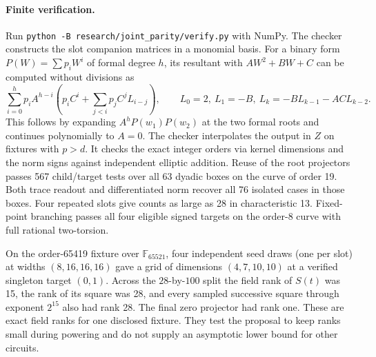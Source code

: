 \documentclass[11pt]{article}
\newcommand{\F}{\mathbb F}
\begin{document}
\paragraph{Finite verification.}
Run \texttt{python -B research/joint\_parity/verify.py} with NumPy.
The checker constructs the slot companion matrices in a monomial
basis. For a binary form $P(W)=\sum p_iW^i$ of formal degree $h$,
its resultant with $AW^2+BW+C$ can be computed without divisions as
\[
 \sum_{i=0}^{h}p_i A^{h-i}
   \left(p_i C^i+\sum_{j<i}p_j C^j L_{i-j}\right),\qquad
 L_0=2,\ L_1=-B,\ L_k=-B L_{k-1}-AC L_{k-2}.
\]
This follows by expanding $A^hP(w_1)P(w_2)$ at the two formal roots
and continues polynomially to $A=0$. The checker interpolates the
output in $Z$ on fixtures with $p>d$. It checks the exact integer
orders via kernel dimensions and the norm signs against independent
elliptic addition. Reuse of the root projectors passes
567 child/target tests over all 63 dyadic boxes on the curve of order
19. Both trace readout and differentiated norm recover all 76
isolated cases in those boxes. Four repeated slots give counts as
large as 28 in characteristic 13. Fixed-point branching passes all
four eligible signed targets on the order-8 curve with full rational
two-torsion.

On the order-65419 fixture over $\F_{65521}$, four independent
seed draws (one per slot) at widths $(8,16,16,16)$ gave a grid of
dimensions $(4,7,10,10)$ at a verified singleton target $(0,1)$.
Across the $28$-by-$100$ split the field rank of $S(t)$ was 15,
the rank of its square was 28, and every sampled successive square
through exponent $2^{15}$ also had rank 28. The final zero projector
had rank one. These are exact field ranks for one disclosed fixture.
They test the proposal to keep ranks small during powering and do
not supply an asymptotic lower bound for other circuits.
\end{document}
